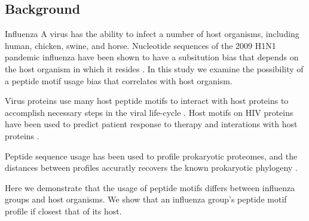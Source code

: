 \documentclass[10pt]{bmc_article}
\newenvironment{bmcformat}{\begin{raggedright}\baselineskip20pt\sloppy\setboolean{publ}{false}}{\end{raggedright}\baselineskip20pt\sloppy}
\begin{document}
\begin{bmcformat}

\section*{Background}
Influenza A virus has the ability to infect a number of host
organisms, including human, chicken, swine, and horse. Nucleotide
sequences of the 2009 H1N1 pandemic influenza have been shown to have
a subsitution bias that depends on the host organism in which it
resides \cite{solovyov2010host}. In this study we examine the
possibility of a peptide motif usage bias that correlates with host
organism.

Virus proteins use many host peptide motifs to interact with host
proteins to accomplish necessary steps in the viral life-cycle
\cite{kadaveru13viral}. Host motifs on HIV proteins have been used to
predict patient response to therapy and interations with host proteins
\cite{chan2009decoding}.

Peptide sequence usage has been used to profile prokaryotic proteomes,
and the distances between profiles accuratly recovers the known
prokaryotic phylogeny \cite{jun2010whole}.

Here we demonstrate that the usage of peptide motifs differs between
influenza groups and host organisms. We show that an influenza group's
peptide motif profile if closest that of its host.
 

\end{bmcformat}
\end{document}
